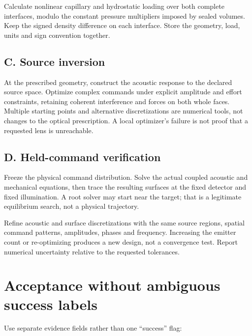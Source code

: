 Calculate nonlinear capillary and hydrostatic loading over both complete
interfaces, modulo the constant pressure multipliers imposed by sealed
volumes. Keep the signed density difference on each interface. Store the
geometry, load, units and sign convention together.

\subsection{C. Source inversion}\label{c.-source-inversion}

At the prescribed geometry, construct the acoustic response to the
declared source space. Optimize complex commands under explicit
amplitude and effort constraints, retaining coherent interference and
forces on both whole faces. Multiple starting points and alternative
discretizations are numerical tools, not changes to the optical
prescription. A local optimizer's failure is not proof that a requested
lens is unreachable.

\subsection{D. Held-command verification}\label{d.-held-command-verification}

Freeze the physical command distribution. Solve the actual coupled
acoustic and mechanical equations, then trace the resulting surfaces at
the fixed detector and fixed illumination. A root solver may start near
the target; that is a legitimate equilibrium search, not a physical
trajectory.

Refine acoustic and surface discretizations with the same source
regions, spatial command patterns, amplitudes, phases and frequency.
Increasing the emitter count or re-optimizing produces a new design, not
a convergence test. Report numerical uncertainty relative to the
requested tolerances.

\section{Acceptance without ambiguous success labels}\label{acceptance-without-ambiguous-success-labels}

Use separate evidence fields rather than one ``success'' flag:

